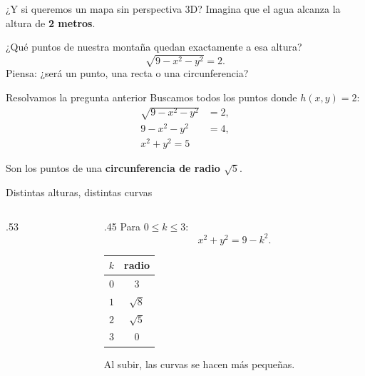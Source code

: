 \documentclass[main.tex]{subfiles}
\begin{document}
\begin{frame}{¿Y si queremos un mapa sin perspectiva 3D?}
Imagina que el agua alcanza la altura de \textbf{2 metros}.
\medskip

¿Qué puntos de nuestra montaña quedan exactamente a esa altura?
\[
\sqrt{9-x^2-y^2}=2.
\]
\vfill
\alert{Piensa: ¿será un punto, una recta o una circunferencia?}
\end{frame}

\begin{frame}{Resolvamos la pregunta anterior}
Buscamos todos los puntos donde $h(x,y)=2$:
\begin{align*}
\sqrt{9-x^2-y^2}&=2,\\
9-x^2-y^2&=4,\\
\boxed{x^2+y^2=5}
\end{align*}
\medskip

Son los puntos de una \textbf{circunferencia de radio $\sqrt5$}.
\end{frame}

\begin{frame}{Distintas alturas, distintas curvas}
\begin{columns}[c]
\begin{column}{.53\textwidth}
\centering
{}
\end{column}
\begin{column}{.45\textwidth}
Para $0\le k\le3$:
\[
x^2+y^2=9-k^2.
\]
\small
\begin{tabular}{c|c}
$k$ & radio \\\hline
$0$ & $3$\\
$1$ & $\sqrt8$\\
$2$ & $\sqrt5$\\
$3$ & $0$\\
\end{tabular}
\medskip

Al subir, las curvas se hacen más pequeñas.
\end{column}
\end{columns}
\end{frame}
\end{document}
